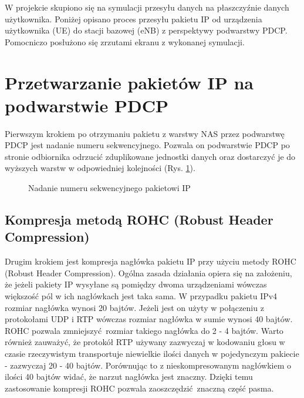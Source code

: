 W projekcie skupiono się na symulacji przesyłu danych na płaszczyźnie danych użytkownika. Poniżej opisano proces przesyłu pakietu IP od urządzenia użytkownika (UE) do stacji bazowej (eNB) z perspektywy podwarstwy PDCP. Pomocniczo posłużono się zrzutami ekranu z wykonanej symulacji.

\section{Przetwarzanie pakietów IP na podwarstwie PDCP}

Pierwszym krokiem po otrzymaniu pakietu z warstwy NAS przez podwarstwę PDCP jest nadanie numeru sekwencyjnego. Pozwala on podwarstwie PDCP po stronie odbiornika odrzucić zduplikowane jednostki danych oraz dostarczyć je do wyższych warstw w odpowiedniej kolejności (Rys. \ref{fig:pdcpseq}).

\begin{figure}[ht]
	\centerline{}
	\caption{Nadanie numeru sekwencyjnego pakietowi IP}
	\label{fig:pdcpseq}
\end{figure}

\subsection{Kompresja metodą ROHC (Robust Header Compression)}

Drugim krokiem jest kompresja nagłówka pakietu IP przy użyciu metody ROHC (Robust Header Compression). Ogólna zasada działania opiera się na założeniu, że jeżeli pakiety IP wysyłane są pomiędzy dwoma urządzeniami wówczas większość pól w ich nagłówkach jest taka sama. W przypadku pakietu IPv4 rozmiar nagłówka wynosi 20 bajtów. Jeżeli jest on użyty w połączeniu z protokołami UDP i RTP wówczas rozmiar nagłówka w sumie wynosi 40 bajtów. ROHC pozwala zmniejszyć rozmiar takiego nagłówka do 2 - 4 bajtów. Warto również zauważyć, że protokół RTP używany zazwyczaj w kodowaniu głosu w czasie rzeczywistym transportuje niewielkie ilości danych w pojedynczym pakiecie - zazwyczaj 20 - 40 bajtów. Porównując to z nieskompresowanym nagłówkiem o ilości 40 bajtów widać, że narzut nagłówka jest znaczny. Dzięki temu zastosowanie kompresji ROHC pozwala zaoszczędzić znaczną część pasma.

